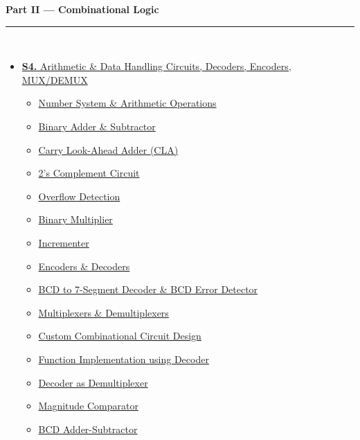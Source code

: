 \documentclass[12pt,a3paper]{article}
\begin{document}
\begin{tcolorbox}[breakable,colback=cD!5,colframe=cD,boxrule=1pt,arc=5pt,
  left=8pt,right=8pt,top=8pt,bottom=8pt,before skip=4pt]
  {\large\bfseries\textcolor{cD}{Part II --- Combinational Logic}}\\[5pt]
  \textcolor{cD!40}{\rule{\textwidth}{0.4pt}}\\[3pt]
  \small\begin{itemize}[leftmargin=1.2em,itemsep=1pt,label={\textcolor{cD}{$\triangleright$}}]
    \item \hyperref[sec:S4]{\textbf{S4.} Arithmetic \& Data Handling Circuits, Decoders, Encoders, MUX/DEMUX}
      \begin{itemize}[leftmargin=1.5em,itemsep=0pt,label={\textcolor{cD}{$\cdot$}}]
        \item \hyperref[sub:s4-number-sys]{Number System \& Arithmetic Operations}
        \item \hyperref[sub:s4-adder-sub]{Binary Adder \& Subtractor}
        \item \hyperref[sub:s4-cla]{Carry Look-Ahead Adder (CLA)}
        \item \hyperref[sub:s4-2scomp]{2's Complement Circuit}
        \item \hyperref[sub:s4-overflow]{Overflow Detection}
        \item \hyperref[sub:s4-multiplier]{Binary Multiplier}
        \item \hyperref[sub:s4-incrementer]{Incrementer}
        \item \hyperref[sub:s4-encoders]{Encoders \& Decoders}
        \item \hyperref[sub:s4-bcd]{BCD to 7-Segment Decoder \& BCD Error Detector}
        \item \hyperref[sub:s4-mux]{Multiplexers \& Demultiplexers}
        \item \hyperref[sub:s4-comb-custom]{Custom Combinational Circuit Design}
        \item \hyperref[sub:s4-decoder-func]{Function Implementation using Decoder}
        \item \hyperref[sub:s4-demux]{Decoder as Demultiplexer}
        \item \hyperref[sub:s4-comparator]{Magnitude Comparator}
        \item \hyperref[sub:s4-bcd-addsub]{BCD Adder-Subtractor}
      \end{itemize}
  \end{itemize}
\end{tcolorbox}
\end{document}
